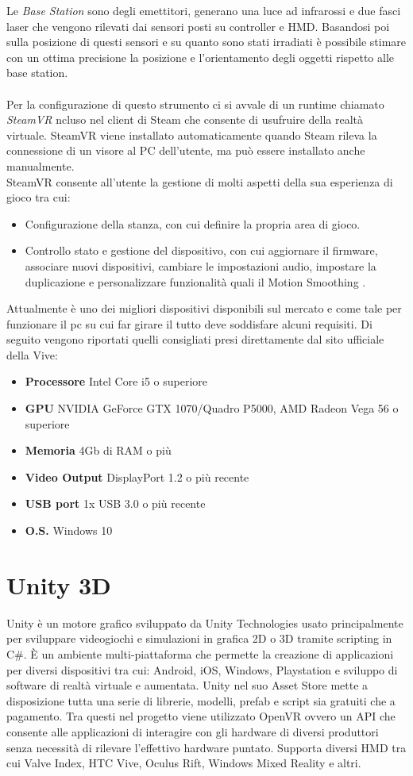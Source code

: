 Le \textit{Base Station} sono degli emettitori, generano una luce ad infrarossi e due fasci laser che vengono rilevati dai sensori posti su controller e HMD. Basandosi poi sulla posizione di questi sensori e su quanto sono stati irradiati è possibile stimare con un ottima precisione la posizione e l'orientamento degli oggetti rispetto alle base station.\\\\
Per la configurazione di questo strumento ci si avvale di un runtime chiamato \textit{SteamVR} ncluso nel client di Steam che consente di usufruire della realtà virtuale. SteamVR viene installato automaticamente quando Steam rileva la connessione di un visore al PC dell'utente, ma può essere installato anche manualmente.\\
SteamVR consente all'utente la gestione di molti aspetti della sua esperienza di gioco tra cui:
\begin{itemize}
	\item Configurazione della stanza, con cui definire la propria area di gioco.
	\item Controllo stato e gestione del dispositivo, con cui aggiornare il firmware, associare nuovi dispositivi, cambiare le impostazioni audio, impostare la duplicazione e personalizzare funzionalità quali il Motion Smoothing \cite{steamvr}.
\end{itemize}
Attualmente è uno dei migliori dispositivi disponibili sul mercato e come tale per funzionare il pc su cui far girare il tutto deve soddisfare alcuni requisiti. Di seguito vengono riportati quelli consigliati presi direttamente dal sito ufficiale della Vive:
\begin{itemize}
	\item \textbf{Processore} Intel Core i5 o superiore
	\item \textbf{GPU} NVIDIA GeForce GTX 1070/Quadro P5000, AMD Radeon Vega 56 o superiore
	\item \textbf{Memoria} 4Gb di RAM o più
	\item \textbf{Video Output} DisplayPort 1.2 o più recente
	\item \textbf{USB port} 1x USB 3.0 o più recente
	\item \textbf{O.S.} Windows 10
\end{itemize} 

\section{Unity 3D}
Unity è un motore grafico sviluppato da Unity Technologies usato principalmente per sviluppare videogiochi e simulazioni in grafica 2D o 3D tramite scripting in C\#. È un ambiente multi-piattaforma che permette la creazione di applicazioni per diversi dispositivi tra cui: Android, iOS, Windows, Playstation e sviluppo di software di realtà virtuale e aumentata. Unity nel suo Asset Store mette a disposizione tutta una serie di librerie, modelli, prefab e script sia gratuiti che a pagamento. Tra questi nel progetto viene utilizzato OpenVR ovvero un API che consente alle applicazioni di interagire con gli hardware di diversi produttori senza necessità di rilevare l'effettivo hardware puntato. Supporta diversi HMD tra cui Valve Index, HTC Vive, Oculus Rift, Windows Mixed Reality e altri.
